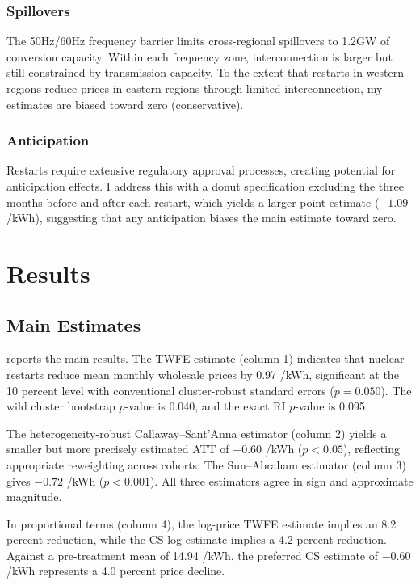 \documentclass[12pt]{article}
\newcommand{\yen}{\textyen}
\begin{document}
\subsubsection*{Spillovers} The 50Hz/60Hz frequency barrier limits cross-regional spillovers to 1.2GW of conversion capacity. Within each frequency zone, interconnection is larger but still constrained by transmission capacity. To the extent that restarts in western regions reduce prices in eastern regions through limited interconnection, my estimates are biased toward zero (conservative).

\subsubsection*{Anticipation} Restarts require extensive regulatory approval processes, creating potential for anticipation effects. I address this with a donut specification excluding the three months before and after each restart, which yields a larger point estimate ($-1.09$ \yen/kWh), suggesting that any anticipation biases the main estimate toward zero.


\section{Results}
\label{sec:results}

\subsection{Main Estimates}

 reports the main results. The TWFE estimate (column 1) indicates that nuclear restarts reduce mean monthly wholesale prices by 0.97 \yen/kWh, significant at the 10 percent level with conventional cluster-robust standard errors ($p=0.050$). The wild cluster bootstrap $p$-value is 0.040, and the exact RI $p$-value is 0.095.

The heterogeneity-robust Callaway--Sant'Anna estimator (column 2) yields a smaller but more precisely estimated ATT of $-0.60$ \yen/kWh ($p<0.05$), reflecting appropriate reweighting across cohorts. The Sun--Abraham estimator (column 3) gives $-0.72$ \yen/kWh ($p<0.001$). All three estimators agree in sign and approximate magnitude.

In proportional terms (column 4), the log-price TWFE estimate implies an 8.2 percent reduction, while the CS log estimate implies a 4.2 percent reduction. Against a pre-treatment mean of 14.94 \yen/kWh, the preferred CS estimate of $-0.60$ \yen/kWh represents a 4.0 percent price decline.
\end{document}
